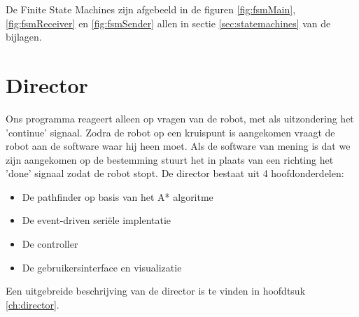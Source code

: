 \documentclass{report}
\begin{document}
De Finite State Machines zijn afgebeeld in de figuren \ref{fig:fsmMain}, \ref{fig:fsmReceiver} en \ref{fig:fsmSender} allen in sectie \ref{sec:statemachines} van de bijlagen.

\section{Director}
Ons programma reageert alleen op vragen van de robot, met als uitzondering het 'continue' signaal.
Zodra de robot op een kruispunt is aangekomen vraagt de robot aan de software waar hij heen moet.
Als de software van mening is dat we zijn aangekomen op de bestemming stuurt het in plaats van een richting het 'done' signaal zodat de robot stopt.
De director bestaat uit 4 hoofdonderdelen:
\begin{itemize}
\item De pathfinder op basis van het A* algoritme
\item De event-driven seriële implentatie
\item De controller
\item De gebruikersinterface en visualizatie
\end{itemize}
Een uitgebreide beschrijving van de director is te vinden in hoofdtsuk \ref{ch:director}.
\end{document}
